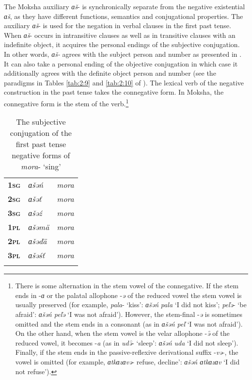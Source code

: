 \documentclass[output=paper]{langsci/langscibook}
\begin{document}
The Moksha auxiliary \textit{ɑš}- is synchronically separate from the negative existential \textit{ɑš}, as they have different functions, semantics and conjugational properties. The auxiliary \textit{ɑš}- is used for the negation in verbal clauses in the first past tense. When \textit{ɑš}- occurs in intransitive clauses as well as in transitive clauses with an indefinite object, it acquires the personal endings of the subjective conjugation. In other words, \textit{ɑš-} agrees with the subject person and number as presented in . It can also take a personal ending of the objective conjugation in which case it additionally agrees with the definite object person and number (see the paradigms in Tables \ref{tab:2:9} and \ref{tab:2:10} of ). The lexical verb of the negative construction in the past tense takes the connegative form. In Moksha, the connegative form is the stem of the verb.\footnote{There is some alternation in the stem vowel of the connegative. If the stem ends in -\textit{ɑ} or the palatal allophone -\textit{ə} of the reduced vowel the stem vowel is usually preserved (for example, \textit{pala}- `kiss': \textit{ɑšəń} \textit{pala} `I did not kiss'; \textit{peľə}- `be afraid': \textit{ɑšəń peľə} `I was not afraid'). However, the stem-final -\textit{ə} is sometimes omitted and the stem ends in a consonant (as in \textit{ɑšəń peľ} `I was not afraid'). On the other hand, when the stem vowel is the velar allophone -\textit{ǝ̑} of the reduced vowel, it becomes -\textit{a} (as in \textit{udǝ̑}- `sleep': \textit{ɑšəń uda} `I did not sleep'). Finally, if the stem ends in the passive-reflexive derivational suffix -\textit{və}-, the vowel is omitted (for example, \textit{ɑtkɑzɑvə}- refuse, decline': \textit{ɑšəń ɑtkɑzɑv} `I did not refuse').}

\begin{table}
\caption{The subjective conjugation of the first past tense negative forms of \textit{mora}- `sing'}
\label{tab:2:6}
\begin{tabularx}{.33\textwidth}{XXX}
\lsptoprule
\textbf{\textsc{1sg}} & \textit{ɑšəń}	&\textit{mora}    \\
\textbf{\textsc{2sg}} & \textit{ɑšəť}		&\textit{mora}\\
\textbf{\textsc{3sg}} & \textit{ɑšəź}		&\textit{mora}\\
\textbf{\textsc{1pl}} & \textit{ɑšəmä}	&\textit{mora}  \\
\textbf{\textsc{2pl}} & \textit{ɑšəďä}		&\textit{mora}  \\
\textbf{\textsc{3pl}} & \textit{ɑšəśť}	&\textit{mora}\\
\lspbottomrule
\end{tabularx}
\end{table}
\end{document}
